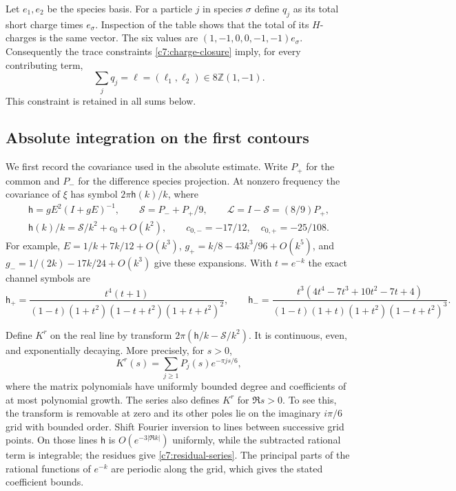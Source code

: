 Let $e_1,e_2$ be the species basis.  For a particle $j$ in species $\sigma$
define $q_j$ as its total short charge times $e_\sigma$.  Inspection of the
table shows that the total of its $H$-charges is the same vector.  The six
values are $(1,-1,0,0,-1,-1)e_\sigma$.  Consequently the trace constraints
\eqref{c7:charge-closure} imply, for every contributing term,
\begin{equation}\label{c7:gas-charge-closure}
\sum_jq_j=\boldsymbol\ell=(\ell_1,\ell_2)\in8\mathbb Z(1,-1).
\end{equation}
This constraint is retained in all sums below.

\subsection{Absolute integration on the first contours}

We first record the covariance used in the absolute estimate.  Write
$P_+$ for the common and $P_-$ for the difference species projection.  At nonzero
frequency the covariance of $\xi$ has symbol $2\pi\mathsf h(k)/k$, where
\begin{equation}\label{c7:xi-symbol}
\begin{gathered}
\mathsf h=gE^2(I+gE)^{-1},\qquad
\mathcal S=P_-+P_+/9,\qquad \mathcal L=I-\mathcal S=(8/9)P_+,\\
\mathsf h(k)/k=\mathcal S/k^2+c_0+O(k^2),\qquad
c_{0,-}=-17/12,\quad c_{0,+}=-25/108.
\end{gathered}
\end{equation}
For example, $E=1/k+7k/12+O(k^3)$,
$g_+=k/8-43k^3/96+O(k^5)$, and
$g_-=1/(2k)-17k/24+O(k^3)$ give these expansions.  With $t=e^{-k}$ the
exact channel symbols are
\[
\mathsf h_+=\frac{t^4(t+1)}{(1-t)(1+t^2)(1-t+t^2)(1+t+t^2)^2},\qquad
\mathsf h_-=\frac{t^3(4t^4-7t^3+10t^2-7t+4)}
 {(1-t)(1+t)(1+t^2)(1-t+t^2)^3}.
\]

Define $K^r$ on the real line by transform
$2\pi(\mathsf h/k-\mathcal S/k^2)$.  It is continuous, even, and
exponentially decaying.  More precisely, for $s>0$,
\begin{equation}\label{c7:residual-series}
K^r(s)=\sum_{j\ge1}P_j(s)e^{-\pi j s/6},
\end{equation}
where the matrix polynomials have uniformly bounded degree and coefficients
of at most polynomial growth.  The series also defines $K^r$ for $\Re s>0$.
To see this, the transform is removable at zero and its other poles lie on
the imaginary $i\pi/6$ grid with bounded order.  Shift Fourier inversion to
lines between successive grid points.  On those lines $\mathsf h$ is
$O(e^{-3|\Re k|})$ uniformly, while the subtracted rational term is
integrable; the residues give \eqref{c7:residual-series}.  The principal
parts of the rational functions of $e^{-k}$ are periodic along the grid,
which gives the stated coefficient bounds.

